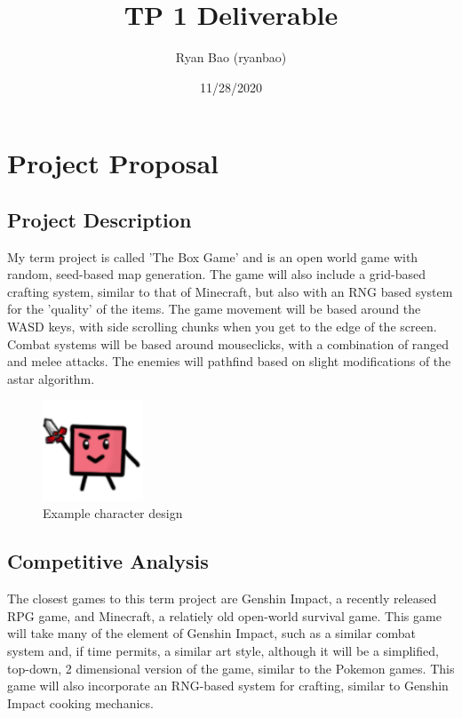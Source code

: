 \documentclass[12pt]{article}
\begin{document}
\title{TP 1 Deliverable}
\author{Ryan Bao (ryanbao)}
\date{11/28/2020}
\maketitle
{}
\tableofcontents
\listoffigures
\newpage
{}
\section{Project Proposal}
\subsection{Project Description}
    My term project is called 'The Box Game' and is an open world game
with random, seed-based map generation. The game will also include 
a grid-based crafting system, similar to that of Minecraft, but also
with an RNG based system for the 'quality' of the items. The game 
movement will be based around the WASD keys, with side scrolling chunks
when you get to the edge of the screen. Combat systems will be based 
around mouseclicks, with a combination of ranged and melee attacks. 
The enemies will pathfind based on slight modifications of the astar 
algorithm. 

\begin{figure}[h]
    \centering
    \includegraphics[width = 3cm]{char.PNG}
    \caption{Example character design}
\end{figure}

\subsection{Competitive Analysis}
    The closest games to this term project are Genshin Impact, a recently
released RPG game, and Minecraft, a relatiely old open-world survival 
game. This game will take many of the element of Genshin Impact, such 
as a similar combat system and, if time permits, a similar art style, 
although it will be a simplified, top-down, 2 dimensional version of 
the game, similar to the Pokemon games. This game will also incorporate 
an RNG-based system for crafting, similar to Genshin Impact cooking
mechanics. 
\end{document}
